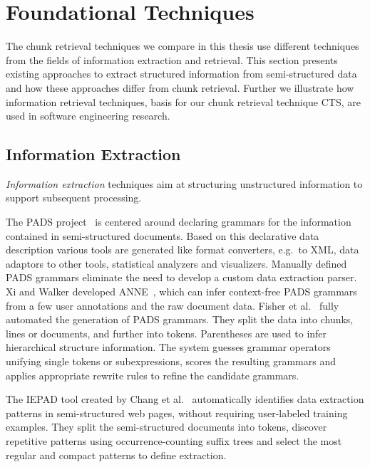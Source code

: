 \documentclass[\myrootdir/main.tex]{subfiles}
\begin{document}
\section{Foundational Techniques}

The chunk retrieval techniques we compare in this thesis use different techniques from the fields of information extraction and retrieval.
This section presents existing approaches to extract structured information from semi-structured data and how these approaches differ from chunk retrieval.
Further we illustrate how information retrieval techniques, basis for our chunk retrieval technique CTS, are used in software engineering research.

\subsection{Information Extraction} %
\emph{Information extraction} techniques aim at structuring unstructured information to support subsequent processing.

The PADS project~\cite{fisher2011the-pads} is centered around declaring grammars for the information contained in semi-structured documents.
Based on this declarative data description various tools are generated like format converters, e.g.\ to XML, data adaptors to other tools, statistical analyzers and visualizers.
Manually defined PADS grammars eliminate the need to develop a custom data extraction parser.
Xi and Walker developed ANNE~\cite{xi2010a-context-free}, which can infer context-free PADS grammars from a few user annotations and the raw document data.
Fisher et al.~\cite{fisher2008from} fully automated the generation of PADS grammars.
They split the data into chunks, lines or documents, and further into tokens.
Parentheses are used to infer hierarchical structure information.
The system guesses grammar operators unifying single tokens or subexpressions, scores the resulting grammars and applies appropriate rewrite rules to refine the candidate grammars.

The IEPAD tool created by Chang et al.~\cite{chang2003automatic} automatically identifies data extraction patterns in semi-structured web pages, without requiring user-labeled training examples.
They split the semi-structured documents into tokens, discover repetitive patterns using occurrence-counting suffix trees and select the most regular and compact patterns to define extraction.
\end{document}
